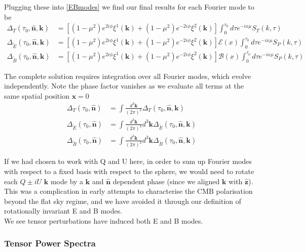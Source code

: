 \documentclass[a4paper,10pt]{article}
\renewcommand{\v}[1]{\mathbf{#1}}
\newcommand{\fint}[1]{\int \frac{d^3 \v{#1}}{(2\pi)^3}}
\newcommand{\unit}[1]{\hat{\v{#1}}}
\begin{document}
Plugging these into \ref{EBmodes} we find our final results for each Fourier mode to be
\begin{equation}\begin{split}
\Delta_T(\tau_0,\unit{n},\v{k}) &= [(1-\mu^2) e^{2i\phi} \xi^1(\v{k})+(1-\mu^2) e^{-2i\phi} \xi^2(\v{k})]\int_0^{\tau_0}d\tau e^{-ix\mu}S_T(k,\tau)\\
\Delta_{\tilde{E}}(\tau_0,\unit{n},\v{k}) &= [(1-\mu^2) e^{2i\phi} \xi^1(\v{k})+(1-\mu^2) e^{-2i\phi} \xi^2(\v{k})]\mathcal{E}(x)\int_0^{\tau_0}d\tau e^{-ix\mu}S_P(k,\tau)\\
\Delta_{\tilde{B}}(\tau_0,\unit{n},\v{k}) &= [(1-\mu^2) e^{2i\phi} \xi^1(\v{k})+(1-\mu^2) e^{-2i\phi} \xi^2(\v{k})]\mathcal{B}(x)\int_0^{\tau_0}d\tau e^{-ix\mu}S_P(k,\tau)
\label{LoSFourier}
\end{split}\end{equation}

The complete solution requires integration over all Fourier modes, which evolve independently. Note the phase factor vanishes as we evaluate all terms at the same spatial position $\v{x}=0$ 
\begin{equation}\begin{split}
\Delta_T(\tau_0,\unit{n}) &= \fint{k} \Delta_T(\tau_0,\unit{n},\v{k})\\
\Delta_{\tilde{E}}(\tau_0,\unit{n}) &= \fint{k} d^3\v{k}\Delta_{\tilde{E}}(\tau_0,\unit{n},\v{k})\\
\Delta_{\tilde{B}}(\tau_0,\unit{n}) &= \fint{k} d^3\v{k}\Delta_{\tilde{B}}(\tau_0,\unit{n},\v{k})
\end{split}\end{equation}

If we had chosen to work with Q and U here, in order to sum up Fourier modes with respect to a fixed basis with respect to the sphere, we would need to rotate each $Q\pm iU$ $\v{k}$ mode by a $\v{k}$ and $\unit{n}$ dependent phase (since we aligned $\v{k}$ with $\unit{z}$). This was a complication in early attempts to characterise the CMB polarisation beyond the flat sky regime, and we have avoided it through our definition of rotationally invariant E and B modes.\\

We see tensor perturbations have induced both E and B modes.

\subsubsection{Tensor Power Spectra}
\end{document}
